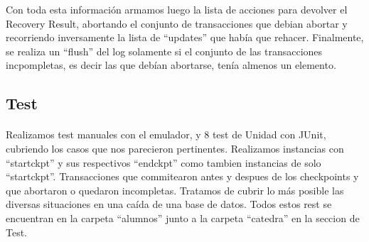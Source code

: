 \documentclass[11pt, a4paper]{article}
\begin{document}
Con toda esta información armamos luego la lista de acciones para devolver el Recovery Result, abortando el conjunto de transacciones que debian abortar y recorriendo inversamente la lista de ``updates'' que había que rehacer. Finalmente, se realiza un ``flush'' del log solamente si el conjunto de las transacciones incpompletas, es decir las que debían abortarse, tenía almenos un elemento.
\paragraph{}

\subsection{Test}
\paragraph{}
Realizamos test manuales con el emulador, y 8 test de Unidad con JUnit, cubriendo los casos que nos parecieron pertinentes. Realizamos instancias con ``startckpt'' y sus respectivos ``endckpt'' como tambien instancias de solo ``startckpt''. Transacciones que commitearon antes y despues de los checkpoints y que abortaron o quedaron incompletas. Tratamos de cubrir lo más posible las diversas situaciones en una caída de una base de datos. Todos estos rest se encuentran en la carpeta ``alumnos'' junto a la carpeta ``catedra'' en la seccion de Test.
\end{document}
